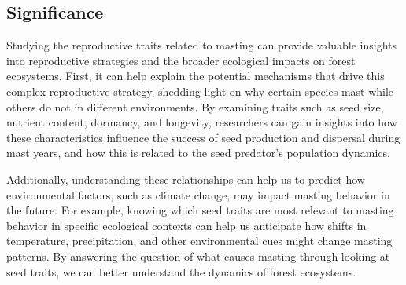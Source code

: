 \documentclass[11pt,letter]{article}
\begin{document}
\subsection{Significance} 
Studying the reproductive traits related to masting can provide valuable insights into reproductive strategies and the broader ecological impacts on forest ecosystems. First, it can help explain the potential mechanisms that drive this complex reproductive strategy, shedding light on why certain species mast while others do not in different environments. By examining traits such as seed size, nutrient content, dormancy, and longevity, researchers can gain insights into how these characteristics influence the success of seed production and dispersal during mast years, and how this is related to the seed predator's population dynamics.\par
Additionally, understanding these relationships can help us to predict how environmental factors, such as climate change, may impact masting behavior in the future. For example, knowing which seed traits are most relevant to masting behavior in specific ecological contexts can help us anticipate how shifts in temperature, precipitation, and other environmental cues might change masting patterns. By answering the question of what causes masting through looking at seed traits, we can better understand the dynamics of forest ecosystems.\par
\end{document}
